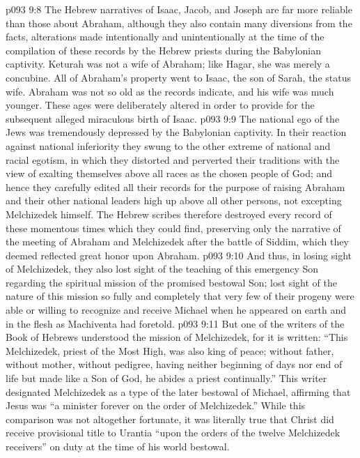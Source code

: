 \vs p093 9:8 The Hebrew narratives of Isaac, Jacob, and Joseph are far more reliable than those about Abraham, although they also contain many diversions from the facts, alterations made intentionally and unintentionally at the time of the compilation of these records by the Hebrew priests during the Babylonian captivity. Keturah was not a wife of Abraham; like Hagar, she was merely a concubine. All of Abraham’s property went to Isaac, the son of Sarah, the status wife. Abraham was not so old as the records indicate, and his wife was much younger. These ages were deliberately altered in order to provide for the subsequent alleged miraculous birth of Isaac.
\vs p093 9:9 \pc The national ego of the Jews was tremendously depressed by the Babylonian captivity. In their reaction against national inferiority they swung to the other extreme of national and racial egotism, in which they distorted and perverted their traditions with the view of exalting themselves above all races as the chosen people of God; and hence they carefully edited all their records for the purpose of raising Abraham and their other national leaders high up above all other persons, not excepting Melchizedek himself. The Hebrew scribes therefore destroyed every record of these momentous times which they could find, preserving only the narrative of the meeting of Abraham and Melchizedek after the battle of Siddim, which they deemed reflected great honor upon Abraham.
\vs p093 9:10 And thus, in losing sight of Melchizedek, they also lost sight of the teaching of this emergency Son regarding the spiritual mission of the promised bestowal Son; lost sight of the nature of this mission so fully and completely that very few of their progeny were able or willing to recognize and receive Michael when he appeared on earth and in the flesh as Machiventa had foretold.
\vs p093 9:11 But one of the writers of the Book of Hebrews understood the mission of Melchizedek, for it is written: “This Melchizedek, priest of the Most High, was also king of peace; without father, without mother, without pedigree, having neither beginning of days nor end of life but made like a Son of God, he abides a priest continually.” This writer designated Melchizedek as a type of the later bestowal of Michael, affirming that Jesus was “a minister forever on the order of Melchizedek.” While this comparison was not altogether fortunate, it was literally true that Christ did receive provisional title to Urantia “upon the orders of the twelve Melchizedek receivers” on duty at the time of his world bestowal.
